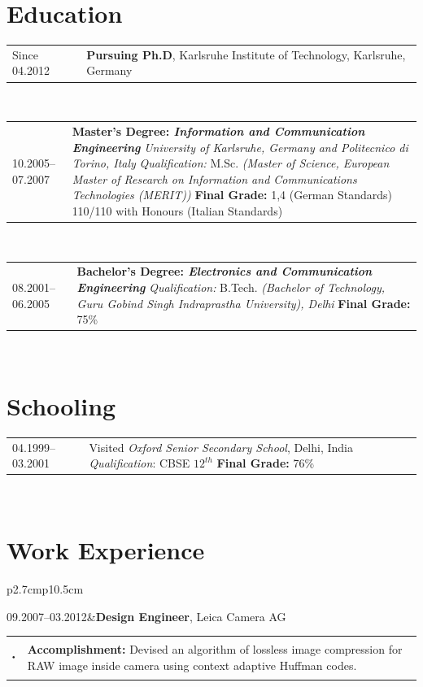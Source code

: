 \documentclass[11pt,a4paper]{article}
\newcommand{\itemline}[3]{\noindent\begin{tabular}{p{2.7cm}p{10.5cm}}\rule{0mm}{#1mm}#2&#3\end{tabular}\\}
\newcommand{\itemcirc}[1]{\rule{#1mm}{0mm}\begin{footnotesize}$^{_{\bullet}}$\end{footnotesize}}
\newcommand{\drawhline}{\noindent \begin{tabular}{p{\textwidth}}\hline\\ \vspace{\textwidth}\\ \end{tabular}}
\begin{document}
\section*{Education}
\itemline{0}{Since 04.2012}{ 	\textbf{Pursuing Ph.D}, Karlsruhe Institute of Technology, Karlsruhe, Germany} \newline
\itemline{0}{10.2005--07.2007}{ 	\textbf{Master's Degree:\newline  
						\textbf{\emph{Information and Communication Engineering}}}\newline 
						\emph{University of Karlsruhe, Germany and Politecnico di Torino, Italy}\newline
						\textit{Qualification:} M.Sc. \emph{(Master of Science,  European Master of Research on Information and Communications Technologies (MERIT))} 
\newline
						 \textbf{Final Grade:} 1,4 (German Standards) 110/110 with Honours (Italian Standards) 
}
						
\vspace{0.4cm}
\itemline{0}{08.2001--06.2005}{ 	\textbf{Bachelor's Degree:\newline  
								\textbf{\emph{Electronics and Communication Engineering}}}\newline 
								\textit{Qualification:} B.Tech. \emph{(Bachelor of Technology, Guru Gobind Singh Indraprastha University), Delhi}
\newline
						 \textbf{Final Grade:} 75\%
} 
						
\section*{Schooling}

\itemline{0}{04.1999--03.2001}{ 	Visited \emph{Oxford Senior Secondary School}, Delhi, India\newline 
						\textit{Qualification}: CBSE $12^{th}$ 
\newline
						 \textbf{Final Grade:} 76\%
}

\section*{Work Experience}

\itemline{6}{09.2007--03.2012}{\textbf{Design Engineer}, Leica Camera AG \newline
			\begin{tabular} {p{2mm}p{10cm}}
			\itemcirc{0} & {\textbf{Accomplishment:}} Devised an algorithm of lossless image compression for RAW image inside camera using context adaptive Huffman codes. 
			\end{tabular}}
\end{document}

